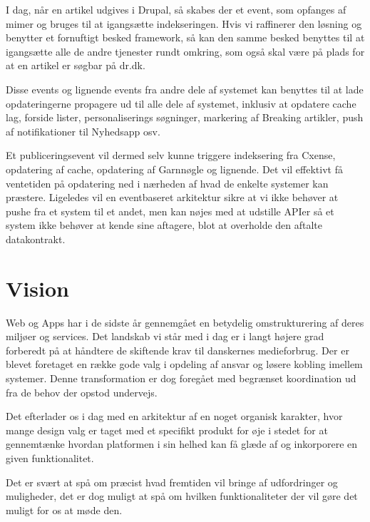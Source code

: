 \documentclass{article}
\begin{document}
I dag, når en artikel udgives i Drupal, så skabes der et event, som opfanges af mimer og bruges til at igangsætte indekseringen.
Hvis vi raffinerer den løsning og benytter et fornuftigt besked framework, så kan den samme besked benyttes til at igangsætte alle de andre tjenester rundt omkring, som også skal være på plads for at en artikel er søgbar på dr.dk.

Disse events og lignende events fra andre dele af systemet kan benyttes til at lade opdateringerne propagere ud til alle dele af systemet, inklusiv at opdatere cache lag, forside lister, personaliserings søgninger, markering af Breaking artikler, push af notifikationer til Nyhedsapp  osv. 

Et publiceringsevent vil dermed selv kunne triggere indeksering fra Cxense, opdatering af cache, opdatering af Garnnøgle og lignende. Det vil effektivt få ventetiden på opdatering ned i nærheden af hvad de enkelte systemer kan præstere.
Ligeledes vil en eventbaseret arkitektur sikre at vi ikke behøver at pushe fra et system til et andet, men kan nøjes med at udstille APIer så et system ikke behøver at kende sine aftagere, blot at overholde den aftalte datakontrakt.


\section{Vision}
Web og Apps har i de sidste år gennemgået en betydelig omstrukturering af deres miljøer og services. Det landskab vi står med i dag er i langt højere grad forberedt på at håndtere de skiftende krav til danskernes medieforbrug. Der er blevet foretaget en række gode valg i opdeling af ansvar og løsere kobling imellem systemer. Denne transformation er dog foregået med begrænset koordination ud fra de behov der opstod undervejs. 

Det efterlader os i dag med en arkitektur af en noget organisk karakter, hvor mange design valg er taget med et specifikt produkt for øje i stedet for at gennemtænke hvordan platformen i sin helhed kan få glæde af og inkorporere en given funktionalitet.

Det er svært at spå om præcist hvad fremtiden vil bringe af udfordringer og muligheder, det er dog muligt at spå om hvilken funktionaliteter der vil gøre det muligt for os at møde den.  
\end{document}
